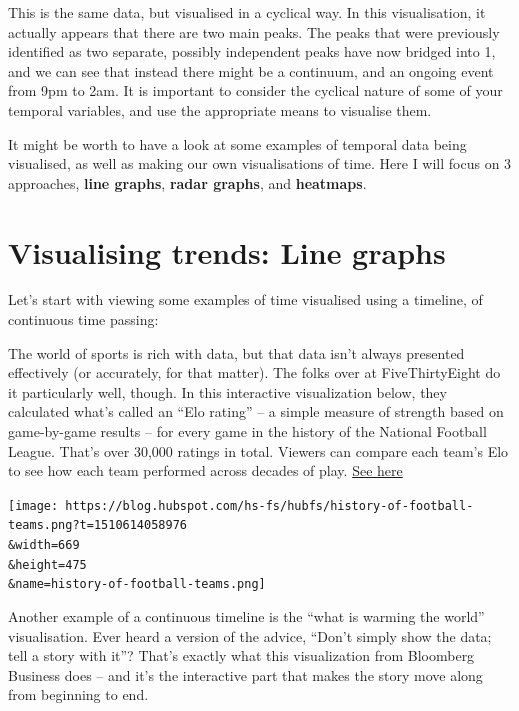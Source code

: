 \documentclass[
]{book}
\begin{document}
This is the same data, but visualised in a cyclical way. In this visualisation, it actually appears that there are two main peaks. The peaks that were previously identified as two separate, possibly independent peaks have now bridged into 1, and we can see that instead there might be a continuum, and an ongoing event from 9pm to 2am. It is important to consider the cyclical nature of some of your temporal variables, and use the appropriate means to visualise them.

It might be worth to have a look at some examples of temporal data being visualised, as well as making our own visualisations of time. Here I will focus on 3 approaches, \textbf{line graphs}, \textbf{radar graphs}, and \textbf{heatmaps}.

\hypertarget{visualising-trends-line-graphs}{%
\section{Visualising trends: Line graphs}\label{visualising-trends-line-graphs}}

Let's start with viewing some examples of time visualised using a timeline, of continuous time passing:

The world of sports is rich with data, but that data isn't always presented effectively (or accurately, for that matter). The folks over at FiveThirtyEight do it particularly well, though. In this interactive visualization below, they calculated what's called an ``Elo rating'' -- a simple measure of strength based on game-by-game results -- for every game in the history of the National Football League. That's over 30,000 ratings in total. Viewers can compare each team's Elo to see how each team performed across decades of play. \href{http://projects.fivethirtyeight.com/complete-history-of-the-nfl/\#ari}{See here}

\texttt{[image: https://blog.hubspot.com/hs-fs/hubfs/history-of-football-teams.png?t=1510614058976\\\&width=669\\\&height=475\\\&name=history-of-football-teams.png]}

Another example of a continuous timeline is the ``what is warming the world'' visualisation. Ever heard a version of the advice, ``Don't simply show the data; tell a story with it''? That's exactly what this visualization from Bloomberg Business does -- and it's the interactive part that makes the story move along from beginning to end.
\end{document}
